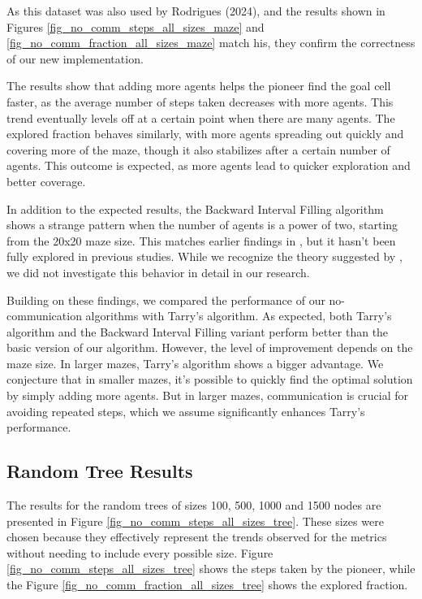 As this dataset was also used by Rodrigues (2024), and the results shown in Figures \ref{fig_no_comm_steps_all_sizes_maze} and \ref{fig_no_comm_fraction_all_sizes_maze} match his, they confirm the correctness of our new implementation.

The results show that adding more agents helps the pioneer find the goal cell faster, as the average number of steps taken decreases with more agents. This trend eventually levels off at a certain point when there are many agents. The explored fraction behaves similarly, with more agents spreading out quickly and covering more of the maze, though it also stabilizes after a certain number of agents. This outcome is expected, as more agents lead to quicker exploration and better coverage.

In addition to the expected results, the Backward Interval Filling algorithm shows a strange pattern when the number of agents is a power of two, starting from the 20x20 maze size. This matches earlier findings in \cite{Arthur2023}, but it hasn't been fully explored in previous studies. While we recognize the theory suggested by , we did not investigate this behavior in detail in our research.

Building on these findings, we compared the performance of our no-communication algorithms with Tarry's algorithm. As expected, both Tarry's algorithm and the Backward Interval Filling variant perform better than the basic version of our algorithm. However, the level of improvement depends on the maze size. In larger mazes, Tarry's algorithm shows a bigger advantage. We conjecture that in smaller mazes, it's possible to quickly find the optimal solution by simply adding more agents. But in larger mazes, communication is crucial for avoiding repeated steps, which we assume significantly enhances Tarry's performance.

\subsection{Random Tree Results} 
\label{subsection_no_comm_random_tree_results}

The results for the random trees of sizes 100, 500, 1000 and 1500 nodes are presented in Figure \ref{fig_no_comm_steps_all_sizes_tree}. These sizes were chosen because they effectively represent the trends observed for the metrics without needing to include every possible size. Figure \ref{fig_no_comm_steps_all_sizes_tree} shows the steps taken by the pioneer, while the Figure \ref{fig_no_comm_fraction_all_sizes_tree} shows the explored fraction.

